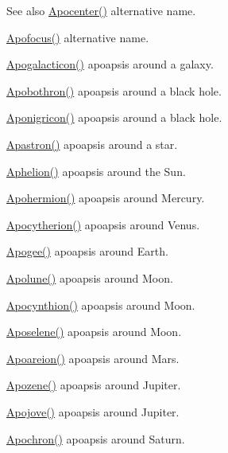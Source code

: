 \begin{DoxySeeAlso}{See also}
\hyperlink{group___e_g_x_phys-_apoapsis_ga5e51a53e2f974264bada34f159fdc948}{Apocenter()} alternative name. 

\hyperlink{group___e_g_x_phys-_apoapsis_gaa53ac4e15bc6bc0fecf72eadb7a513e0}{Apofocus()} alternative name. 

\hyperlink{group___e_g_x_phys-_apoapsis_ga09b4c7d5e971dc28e1ba37f479958c27}{Apogalacticon()} apoapsis around a galaxy. 

\hyperlink{group___e_g_x_phys-_apoapsis_ga6fe084b9e69f47a5032b05aa8f6bf7ad}{Apobothron()} apoapsis around a black hole. 

\hyperlink{group___e_g_x_phys-_apoapsis_ga83e866e2f887ff8eafbc3971d4cab8be}{Aponigricon()} apoapsis around a black hole. 

\hyperlink{group___e_g_x_phys-_apoapsis_ga2fc1c406ce10f59b4f325150aecd279a}{Apastron()} apoapsis around a star. 

\hyperlink{group___e_g_x_phys-_apoapsis_ga77dadb4d082a441c8e85203c983722c7}{Aphelion()} apoapsis around the Sun. 

\hyperlink{group___e_g_x_phys-_apoapsis_gab002349e578241b3514f2212da9a7d48}{Apohermion()} apoapsis around Mercury. 

\hyperlink{group___e_g_x_phys-_apoapsis_ga59a284bb0bc11848c5b9ef1283033425}{Apocytherion()} apoapsis around Venus. 

\hyperlink{group___e_g_x_phys-_apoapsis_ga5cf587a051db28cae9e028a2b4955b0d}{Apogee()} apoapsis around Earth. 

\hyperlink{group___e_g_x_phys-_apoapsis_gacc68b49812c38394611e1ef3a8bf0e3e}{Apolune()} apoapsis around Moon. 

\hyperlink{group___e_g_x_phys-_apoapsis_ga557bb4d1a0ce7f17aaa8f8de469d4f52}{Apocynthion()} apoapsis around Moon. 

\hyperlink{group___e_g_x_phys-_apoapsis_gab61f3b2d6a5be3f62f5fb6dfdf802014}{Aposelene()} apoapsis around Moon. 

\hyperlink{group___e_g_x_phys-_apoapsis_ga8d8ac5814f653e229e1d463b432ffca5}{Apoareion()} apoapsis around Mars. 

\hyperlink{group___e_g_x_phys-_apoapsis_ga44d3dd8d8b350d053b25b7b1f1e15534}{Apozene()} apoapsis around Jupiter. 

\hyperlink{group___e_g_x_phys-_apoapsis_ga5a45d0a873514113aaa0adc95aefbbde}{Apojove()} apoapsis around Jupiter. 

\hyperlink{group___e_g_x_phys-_apoapsis_gae4ea146039e6f32022321f0998e715e8}{Apochron()} apoapsis around Saturn. 


\end{DoxySeeAlso}

